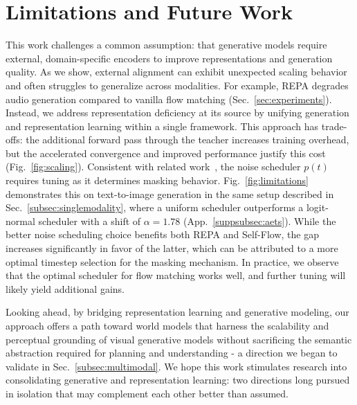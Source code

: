 \section{Limitations and Future Work}
\label{sec:limitations_future_work}

This work challenges a common assumption: that generative models require external, domain-specific encoders to improve representations and generation quality. As we show, external alignment can exhibit unexpected scaling behavior and often struggles to generalize across modalities. For example, REPA degrades audio generation compared to vanilla flow matching (Sec.~\ref{sec:experiments}). Instead, we address representation deficiency at its source by unifying generation and representation learning within a single framework.
This approach has trade-offs: the additional forward pass through the teacher increases training overhead, but the accelerated convergence and improved performance justify this cost (Fig.~\ref{fig:scaling}). Consistent with related work~\citep{sd3, rae}, the noise scheduler $p(t)$ requires tuning as it determines masking behavior. Fig.~\ref{fig:limitations} demonstrates this on text-to-image generation in the same setup described in Sec.~\ref{subsec:singlemodality}, where a uniform scheduler outperforms a logit-normal scheduler with a shift of $\alpha=1.78$ (App.~\ref{suppsubsec:aets}). While the better noise scheduling choice benefits both REPA and Self-Flow, the gap increases significantly in favor of the latter, which can be attributed to a more optimal timestep selection for the masking mechanism. In practice, we observe that the optimal scheduler for flow matching works well, and further tuning will likely yield additional gains.

Looking ahead, by bridging representation learning and generative modeling, our approach offers a path toward world models that harness the scalability and perceptual grounding of visual generative models without sacrificing the semantic abstraction required for planning and understanding - a direction we began to validate in Sec.~\ref{subsec:multimodal}. We hope this work stimulates research into consolidating generative and representation learning: two directions long pursued in isolation that may complement each other better than assumed.

